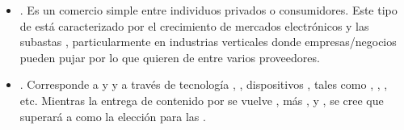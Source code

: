 \begin{itemize}

	\item \textbf{\ctoc}. Es un comercio simple entre individuos privados o consumidores. Este tipo de \ecommerceCOM está caracterizado por el crecimiento de mercados electrónicos y las subastas \online, particularmente en industrias verticales donde empresas/negocios pueden pujar por lo que quieren de entre varios proveedores.

	\item \textbf{\mcommerce}. Corresponde a \buyingCOM y \sellingCOM \itemsCOM y \servicesCOM a través de tecnología \wirelessPC, \ieCPT, dispositivos \handheldPC, tales como \smartphonesCPT, \pdasCPT, \tabletsINT, etc. Mientras la entrega de contenido  por \devicesINT \wirelessPC se vuelve \fasterQA, más \secureQA, y \scalableQA, se cree que \mcommerce superará a \wirelinePC \ecommerceCOM como la elección para las \transactionsDB \commerceCOM.
	
\end{itemize}
